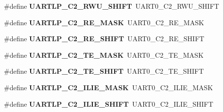 \begin{DoxyCompactItemize}
\item 
\hypertarget{group___backward___compatibility___symbols_ga7e3babc97f1d54f154097c1c3c7f9c13}{}\#define {\bfseries U\+A\+R\+T\+L\+P\+\_\+\+C2\+\_\+\+R\+W\+U\+\_\+\+S\+H\+I\+F\+T}~U\+A\+R\+T0\+\_\+\+C2\+\_\+\+R\+W\+U\+\_\+\+S\+H\+I\+F\+T\label{group___backward___compatibility___symbols_ga7e3babc97f1d54f154097c1c3c7f9c13}

\item 
\hypertarget{group___backward___compatibility___symbols_ga2e5e77f4d10c7c781b36e3d7083daa97}{}\#define {\bfseries U\+A\+R\+T\+L\+P\+\_\+\+C2\+\_\+\+R\+E\+\_\+\+M\+A\+S\+K}~U\+A\+R\+T0\+\_\+\+C2\+\_\+\+R\+E\+\_\+\+M\+A\+S\+K\label{group___backward___compatibility___symbols_ga2e5e77f4d10c7c781b36e3d7083daa97}

\item 
\hypertarget{group___backward___compatibility___symbols_ga7d8e4d4ef51751e7d193373f71e86458}{}\#define {\bfseries U\+A\+R\+T\+L\+P\+\_\+\+C2\+\_\+\+R\+E\+\_\+\+S\+H\+I\+F\+T}~U\+A\+R\+T0\+\_\+\+C2\+\_\+\+R\+E\+\_\+\+S\+H\+I\+F\+T\label{group___backward___compatibility___symbols_ga7d8e4d4ef51751e7d193373f71e86458}

\item 
\hypertarget{group___backward___compatibility___symbols_ga418096fb8e70f64bd1f159cc2e05ce37}{}\#define {\bfseries U\+A\+R\+T\+L\+P\+\_\+\+C2\+\_\+\+T\+E\+\_\+\+M\+A\+S\+K}~U\+A\+R\+T0\+\_\+\+C2\+\_\+\+T\+E\+\_\+\+M\+A\+S\+K\label{group___backward___compatibility___symbols_ga418096fb8e70f64bd1f159cc2e05ce37}

\item 
\hypertarget{group___backward___compatibility___symbols_gab5644d9346e8b389fe0c4b750f16e01e}{}\#define {\bfseries U\+A\+R\+T\+L\+P\+\_\+\+C2\+\_\+\+T\+E\+\_\+\+S\+H\+I\+F\+T}~U\+A\+R\+T0\+\_\+\+C2\+\_\+\+T\+E\+\_\+\+S\+H\+I\+F\+T\label{group___backward___compatibility___symbols_gab5644d9346e8b389fe0c4b750f16e01e}

\item 
\hypertarget{group___backward___compatibility___symbols_ga4be20f5bad98489c568fb934dcd22d87}{}\#define {\bfseries U\+A\+R\+T\+L\+P\+\_\+\+C2\+\_\+\+I\+L\+I\+E\+\_\+\+M\+A\+S\+K}~U\+A\+R\+T0\+\_\+\+C2\+\_\+\+I\+L\+I\+E\+\_\+\+M\+A\+S\+K\label{group___backward___compatibility___symbols_ga4be20f5bad98489c568fb934dcd22d87}

\item 
\hypertarget{group___backward___compatibility___symbols_gab90e873c1b169d382f638afbf736e569}{}\#define {\bfseries U\+A\+R\+T\+L\+P\+\_\+\+C2\+\_\+\+I\+L\+I\+E\+\_\+\+S\+H\+I\+F\+T}~U\+A\+R\+T0\+\_\+\+C2\+\_\+\+I\+L\+I\+E\+\_\+\+S\+H\+I\+F\+T\label{group___backward___compatibility___symbols_gab90e873c1b169d382f638afbf736e569}


\end{DoxyCompactItemize}
